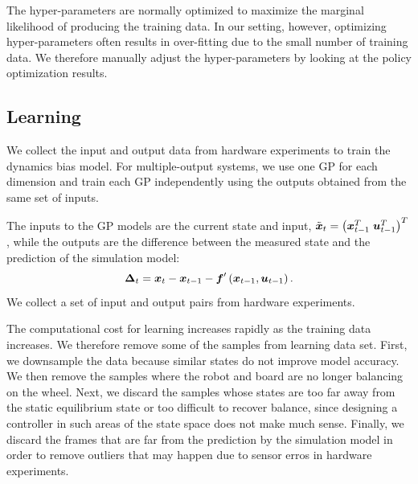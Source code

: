 \documentclass[letterpaper, 10 pt, conference]{ieeeconf}
\begin{document}


The hyper-parameters are normally optimized to maximize the marginal
likelihood of producing the training data.
In our setting, however, optimizing hyper-parameters often results in
over-fitting due to the small number of training data.
We therefore manually adjust the hyper-parameters by looking at the
policy optimization results.


\subsection{Learning} \label{sec:learning_learning}

We collect the input and output data from hardware experiments to train
the dynamics bias model.
For multiple-output systems, we use one GP for each dimension and train each GP
independently using the outputs obtained from the same set of inputs.

The inputs to the GP models are the current state and input,
$\tilde{\mbox{\boldmath \(x\)}}_t = \left(\mbox{\boldmath \(x\)}_{t-1}^T\;
\mbox{\boldmath \(u\)}_{t-1}^T\right)^T$, while the outputs are the difference
between the measured state and the prediction of the simulation model:
\begin{equation}
\mbox{\boldmath \(\Delta\)}_t = \mbox{\boldmath \(x\)}_t - \mbox{\boldmath \(x\)}_{t-1} - \mbox{\boldmath \(f\)}'\left(\mbox{\boldmath \(x\)}_{t-1},\mbox{\boldmath \(u\)}_{t-1}\right).
\end{equation}
We collect a set of input and output pairs from hardware experiments.

The computational cost for learning increases rapidly as the training
data increases.
We therefore remove some of the samples from learning data set.
First, we downsample the data because similar states do not improve
model accuracy.
We then remove the samples where the robot and board are no longer
balancing on the wheel.
Next, we discard the samples whose states are too far away from the static
equilibrium state or too difficult to recover balance, since designing a
controller in such areas of the state space does not make much sense. 
Finally, we discard the frames that are far from the prediction by the
simulation model in order to remove outliers that may happen due to
sensor erros in hardware experiments.
\end{document}

